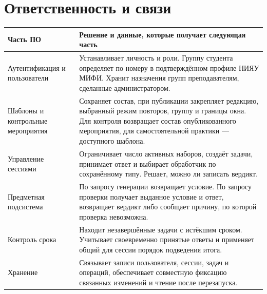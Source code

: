 \documentclass[12pt,a4paper]{article}
\newcounter{none} %
\begin{document}
\section{Ответственность и связи}\label{2-ux43eux442ux432ux435ux442ux441ux442ux432ux435ux43dux43dux43eux441ux442ux44c-ux438-ux441ux432ux44fux437ux438}

\hypertarget{2-ответственность-и-связи}{}

{\def\LTcaptype{none} %
\begin{longtable}[]{@{}
  >{\raggedright\arraybackslash}p{}
  >{\raggedright\arraybackslash}p{}@{}}
\toprule\noalign{}
\begin{minipage}[b]{\linewidth}\raggedright
Часть ПО
\end{minipage} & \begin{minipage}[b]{\linewidth}\raggedright
Решение и данные, которые получает следующая часть
\end{minipage} \\
\midrule\noalign{}
\endhead
\bottomrule\noalign{}
\endlastfoot
Аутентификация и пользователи & Устанавливает личность и роли. Группу студента определяет по номеру в подтверждённом профиле НИЯУ МИФИ. Хранит назначения групп преподавателям, сделанные администратором. \\
Шаблоны и контрольные мероприятия & Сохраняет состав, при публикации закрепляет редакцию, выбранный режим повторов, группу и границы окна. Для контроля возвращает состав опубликованного мероприятия, для самостоятельной практики --- доступного шаблона. \\
Управление сессиями & Ограничивает число активных наборов, создаёт задачи, принимает ответ и выбирает обработчик по сохранённому типу. Решает, можно ли записать вердикт. \\
Предметная подсистема & По запросу генерации возвращает условие. По запросу проверки получает выданное условие и ответ, возвращает вердикт либо сообщает причину, по которой проверка невозможна. \\
Контроль срока & Находит незавершённые задачи с истёкшим сроком. Учитывает своевременно принятые ответы и применяет общий для сессии порядок подведения итога. \\
Хранение & Связывает записи пользователя, сессии, задач и операций, обеспечивает совместную фиксацию связанных изменений и чтение после перезапуска. \\
\end{longtable}
}
\end{document}
